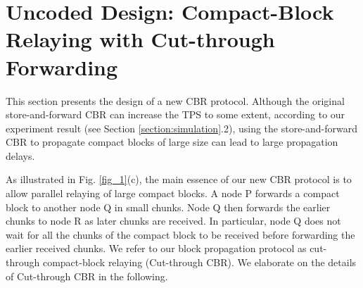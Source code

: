 \documentclass[10pt,journal,compsoc]{IEEEtran}
\begin{document}
\section{Uncoded Design: Compact-Block Relaying with Cut-through Forwarding}\label{section:Uncoded}
This section presents the design of a new CBR protocol. Although the original store-and-forward CBR can increase the TPS to some extent, according to our experiment result (see Section \ref{section:simulation}.2), using the store-and-forward CBR to propagate compact blocks of large size can lead to large propagation delays.  

As illustrated in Fig. \ref{fig_1}(c), the main essence of our new CBR protocol is to allow parallel relaying of large compact blocks. A node P forwards a compact block to another node Q in small chunks. Node Q then forwards the earlier chunks to node R as later chunks are received. In particular, node Q does not wait for all the chunks of the compact block to be received before forwarding the earlier received chunks. We refer to our block propagation protocol as cut-through compact-block relaying (Cut-through CBR). We elaborate on the details of Cut-through CBR in the following.
\end{document}
